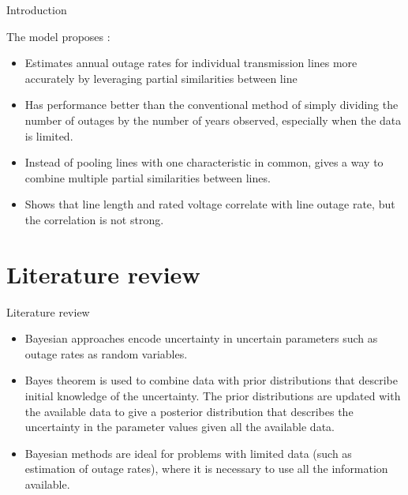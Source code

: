\documentclass{beamer}
\begin{document}
\begin{frame}{Introduction}
\begin{block}{}
The model proposes :
\begin{itemize}
    \item Estimates annual outage rates for individual transmission lines more accurately by leveraging partial similarities between line 
    \item Has performance better than the conventional method of
simply dividing the number of outages by the number of
years observed, especially when the data is limited.
    \item Instead of pooling lines with one characteristic in common, gives a way to combine multiple partial similarities
between lines. 
     
      \item  Shows that line length and rated voltage correlate with line
outage rate, but the correlation is not strong.
      
\end{itemize}

\end{block}
\end{frame}

\section{Literature review}
\begin{frame}{Literature review}
\begin{block}{}
\begin{itemize}
    \item Bayesian approaches encode uncertainty in uncertain parameters such as outage rates as random variables.
    \item Bayes theorem is used to combine
data with prior distributions that describe initial knowledge of
the uncertainty. The prior distributions are updated with the
available data to give a posterior distribution that describes the
uncertainty in the parameter values given all the available data.
   \item Bayesian methods are ideal for problems with limited data
(such as estimation of outage rates), where it is necessary to
use all the information available. 
\end{itemize}
\end{block}
\end{frame}
\end{document}
